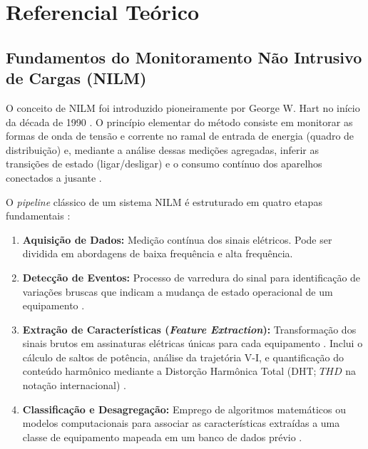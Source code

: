 \documentclass[12pt]{article}
\begin{document}
\section{Referencial Te\'orico}

\subsection{Fundamentos do Monitoramento N\~ao Intrusivo de Cargas (NILM)}

O conceito de NILM foi introduzido pioneiramente por George W. Hart no in\'icio da
d\'ecada de 1990 \cite{ref1}. O princ\'ipio elementar do m\'etodo consiste em
monitorar as formas de onda de tens\~ao e corrente no ramal de entrada de energia
(quadro de distribui\c{c}\~ao) e, mediante a an\'alise dessas medi\c{c}\~oes
agregadas, inferir as transi\c{c}\~oes de estado (ligar/desligar) e o consumo
cont\'inuo dos aparelhos conectados a jusante \cite{ref1}.

O \textit{pipeline} cl\'assico de um sistema NILM \'e estruturado em quatro etapas
fundamentais \cite{ref2,ref7}:

\begin{enumerate}
  \item \textbf{Aquisi\c{c}\~ao de Dados:} Medi\c{c}\~ao cont\'inua dos sinais
  el\'etricos. Pode ser dividida em abordagens de baixa frequ\^encia \cite{ref3}
  e alta frequ\^encia.

  \item \textbf{Detec\c{c}\~ao de Eventos:} Processo de varredura do sinal para
  identifica\c{c}\~ao de varia\c{c}\~oes bruscas que indicam a mudan\c{c}a de
  estado operacional de um equipamento \cite{ref2}.

  \item \textbf{Extra\c{c}\~ao de Caracter\'isticas (\textit{Feature
  Extraction}):} Transforma\c{c}\~ao dos sinais brutos em assinaturas el\'etricas
  \'unicas para cada equipamento \cite{ref2}. Inclui o c\'alculo de saltos de
  pot\^encia, an\'alise da trajet\'oria V-I, e quantifica\c{c}\~ao do conte\'udo
  harm\^onico mediante a Distor\c{c}\~ao Harm\^onica Total (DHT;
  $THD$ na nota\c{c}\~ao internacional) \cite{ref8}.

  \item \textbf{Classifica\c{c}\~ao e Desagrega\c{c}\~ao:} Emprego de algoritmos
  matem\'aticos ou modelos computacionais para associar as caracter\'isticas
  extra\'idas a uma classe de equipamento mapeada em um banco de dados pr\'evio
  \cite{ref4,ref6}.
\end{enumerate}
\end{document}

